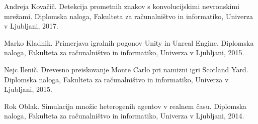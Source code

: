 \documentclass[11pt,a4paper]{article}
\begin{document}
\begin{thebibliography}{9}
	
Andreja Kovačič.
Detekcija prometnih znakov s konvolucijskimi nevronskimi mrežami.
Diplomska naloga, Fakulteta za računalništvo in informatiko, Univerza v Ljubljani, 2017.

Marko Kladnik.
Primerjava igralnih pogonov Unity in Unreal Engine.
Diplomska naloga, Fakulteta za računalništvo in informatiko, Univerza v Ljubljani, 2015.

Nejc Ilenič.
Drevesno preiskovanje Monte Carlo pri namizni igri Scotland Yard. 
Diplomska naloga, Fakulteta za računalništvo in informatiko, Univerza v Ljubljani, 2015.

Rok Oblak.
Simulacija množic heterogenih agentov v realnem času.
Diplomska naloga, Fakulteta za računalništvo in informatiko, Univerza v Ljubljani, 2014.
\end{thebibliography}
\end{document}

